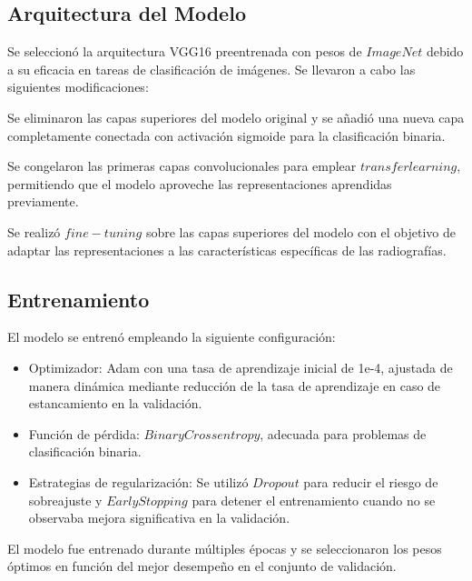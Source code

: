 \documentclass[journal]{IEEEtran}
\begin{document}
\subsection{Arquitectura del Modelo}
Se seleccionó la arquitectura VGG16 preentrenada con pesos de $ImageNet$ debido a su eficacia en tareas de clasificación de imágenes. Se llevaron a cabo las siguientes modificaciones:

Se eliminaron las capas superiores del modelo original y se añadió una nueva capa completamente conectada con activación sigmoide para la clasificación binaria.

Se congelaron las primeras capas convolucionales para emplear $transfer learning$, permitiendo que el modelo aproveche las representaciones aprendidas previamente.

Se realizó $fine-tuning$ sobre las capas superiores del modelo con el objetivo de adaptar las representaciones a las características específicas de las radiografías.

\subsection{Entrenamiento}
El modelo se entrenó empleando la siguiente configuración:
\begin{itemize}
    \item Optimizador: Adam con una tasa de aprendizaje inicial de 1e-4, ajustada de manera dinámica mediante reducción de la tasa de aprendizaje en caso de estancamiento en la validación.
    \item Función de pérdida: $Binary Crossentropy$, adecuada para problemas de clasificación binaria.
    \item Estrategias de regularización: Se utilizó $Dropout$ para reducir el riesgo de sobreajuste y $Early Stopping$ para detener el entrenamiento cuando no se observaba mejora significativa en la validación.
\end{itemize}

El modelo fue entrenado durante múltiples épocas y se seleccionaron los pesos óptimos en función del mejor desempeño en el conjunto de validación.
\end{document}
